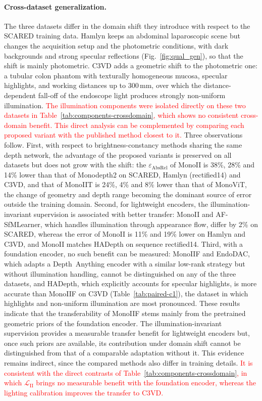 \documentclass[a4paper,fleqn]{cas-dc}
\begin{document}
{\paragraph{Cross-dataset generalization.}
The three datasets differ in the domain shift they introduce with respect to the SCARED training data. Hamlyn keeps an abdominal laparoscopic scene but changes the acquisition setup and the photometric conditions, with dark backgrounds and strong specular reflections (Fig.~\ref{fig:qual_gen}), so that the shift is mainly photometric. C3VD adds a geometric shift to the photometric one: a tubular colon phantom with texturally homogeneous mucosa, specular highlights, and working distances up to 300\,mm, over which the distance-dependent fall-off of the endoscope light produces strongly non-uniform illumination. \textcolor{red}{The illumination components were isolated directly on these two datasets in Table~\ref{tab:components-crossdomain}, which shows no consistent cross-domain benefit. This direct analysis can be complemented by comparing each proposed variant with the published method closest to it.} Three observations follow. First, with respect to brightness-constancy methods sharing the same depth network, the advantage of the proposed variants is preserved on all datasets but does not grow with the shift: the $\varepsilon_\textrm{AbsRel}$ of MonoII is 38\%, 28\% and 14\% lower than that of Monodepth2 on SCARED, Hamlyn (rectified14) and C3VD, and that of MonoIIT is 24\%, 4\% and 8\% lower than that of MonoViT, the change of geometry and depth range becoming the dominant source of error outside the training domain. Second, for lightweight encoders, the illumination-invariant supervision is associated with better transfer: MonoII and AF-SfMLearner, which handles illumination through appearance flow, differ by 2\% on SCARED, whereas the error of MonoII is 11\% and 19\% lower on Hamlyn and C3VD, and MonoII matches HADepth on sequence rectified14. Third, with a foundation encoder, no such benefit can be measured: MonoIIF and EndoDAC, which adapts a Depth~Anything encoder with a similar low-rank strategy but without illumination handling, cannot be distinguished on any of the three datasets, and HADepth, which explicitly accounts for specular highlights, is more accurate than MonoIIF on C3VD (Table~\ref{tab:paired-c1}), the dataset in which highlights and non-uniform illumination are most pronounced. These results indicate that the transferability of MonoIIF stems mainly from the pretrained geometric priors of the foundation encoder. The illumination-invariant supervision provides a measurable transfer benefit for lightweight encoders but, once such priors are available, its contribution under domain shift cannot be distinguished from that of a comparable adaptation without it. This evidence remains indirect, since the compared methods also differ in training details. \textcolor{red}{It is consistent with the direct contrasts of Table~\ref{tab:components-crossdomain}, in which $\mathcal{L}_\textrm{II}$ brings no measurable benefit with the foundation encoder, whereas the lighting calibration improves the transfer to C3VD.}}
\end{document}
